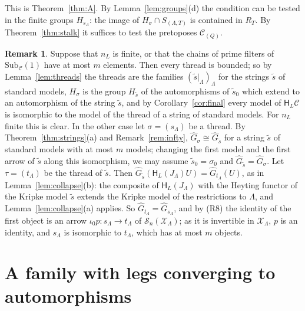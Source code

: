 \documentclass[11pt]{amsart}
\theoremstyle{definition}
\newtheorem{rem}[thm]{Remark}
\newcommand{\Sub}{\mathrm{Sub}}
\newcommand{\HH}{\mathsf H}
\newcommand{\cX}{\mathcal X}
\newcommand{\cC}{\mathcal C}
\newcommand{\cS}{\mathcal S}
\begin{document}
This is Theorem~\ref{thm:A}. By Lemma~\ref{lem:groups}(d) the
condition can be tested in the finite groups $H_{s_\Lambda}$: the
image of $H_\sigma\cap S_{(\Lambda,T)}$ is contained in $R_T$. By
Theorem~\ref{thm:stalk} it suffices to test the pretoposes
$\cC_{(Q)}$.

\begin{rem}\label{rem:strings}
Suppose that $n_L$ is finite, or that the chains of prime filters of
$\Sub_\cC(1)$ have at most $m$ elements. Then every thread is bounded;
so by Lemma~\ref{lem:threads} the threads are the families $(\tilde
s|_\Lambda)_\Lambda$ for the strings $\tilde s$ of standard models,
$H_\sigma$ is the group $H_{\tilde s}$ of the automorphisms of $\tilde
s_0$ which extend to an automorphism of the string $\tilde s$, and
by Corollary~\ref{cor:final} every model of $\HH_L\cC$ is isomorphic
to the model of the thread of a string of standard models. For
$n_L$ finite this is clear. In the other case let $\sigma=(s_\Lambda)$
be a thread. By Theorem~\ref{thm:strings}(a) and
Remark~\ref{rem:infty}, $\hat G_\sigma\cong\hat G_{\tilde s}$ for a
string $\tilde s$ of standard models with at most $m$ models; changing
the first model and the first arrow of $\tilde s$ along this
isomorphism, we may assume $\tilde s_0=\sigma_0$ and $\hat G_{\tilde
s}=\hat G_\sigma$. Let $\tau=(t_\Lambda)$ be the thread of $\tilde s$.
Then $\hat G_{\tilde s}(\HH_L(J_\Lambda)U)=\hat G_{t_\Lambda}(U)$, as
in Lemma~\ref{lem:collapse}(b): the composite of $\HH_L(J_\Lambda)$
with the Heyting functor of the Kripke model $\tilde s$ extends the
Kripke model of the restrictions to $\Lambda$, and
Lemma~\ref{lem:collapse}(a) applies. So $\hat G_{t_\Lambda}=\hat
G_{s_\Lambda}$, and by (R8) the identity of the first object is an
arrow $\iota_0p\colon s_\Lambda\to t_\Lambda$ of
$\cS_n(\cX_\Lambda)$; as it is invertible in $\cX_\Lambda$, $p$ is an
identity, and $s_\Lambda$ is isomorphic to $t_\Lambda$, which has at
most $m$ objects.
\end{rem}

\section{A family with legs converging to automorphisms}\label{sec:family}
\end{document}

